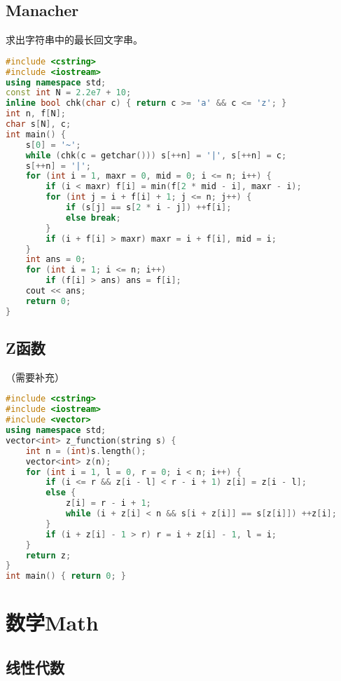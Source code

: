 \documentclass[9pt, a4paper, oneside]{book}
\begin{document}
\section{Manacher}
求出字符串中的最长回文字串。
\begin{lstlisting}[language={C++}]
#include <cstring>
#include <iostream>
using namespace std;
const int N = 2.2e7 + 10;
inline bool chk(char c) { return c >= 'a' && c <= 'z'; }
int n, f[N];
char s[N], c;
int main() {
    s[0] = '~';
    while (chk(c = getchar())) s[++n] = '|', s[++n] = c;
    s[++n] = '|';
    for (int i = 1, maxr = 0, mid = 0; i <= n; i++) {
        if (i < maxr) f[i] = min(f[2 * mid - i], maxr - i);
        for (int j = i + f[i] + 1; j <= n; j++) {
            if (s[j] == s[2 * i - j]) ++f[i];
            else break;
        }
        if (i + f[i] > maxr) maxr = i + f[i], mid = i;
    }
    int ans = 0;
    for (int i = 1; i <= n; i++)
        if (f[i] > ans) ans = f[i];
    cout << ans;
    return 0;
}\end{lstlisting}
\section{Z函数}
（需要补充）
\begin{lstlisting}[language={C++}]
#include <cstring>
#include <iostream>
#include <vector>
using namespace std;
vector<int> z_function(string s) {
    int n = (int)s.length();
    vector<int> z(n);
    for (int i = 1, l = 0, r = 0; i < n; i++) {
        if (i <= r && z[i - l] < r - i + 1) z[i] = z[i - l];
        else {
            z[i] = r - i + 1;
            while (i + z[i] < n && s[i + z[i]] == s[z[i]]) ++z[i];
        }
        if (i + z[i] - 1 > r) r = i + z[i] - 1, l = i;
    }
    return z;
}
int main() { return 0; }\end{lstlisting}
\chapter{数学Math}
\section{线性代数}
\end{document}
